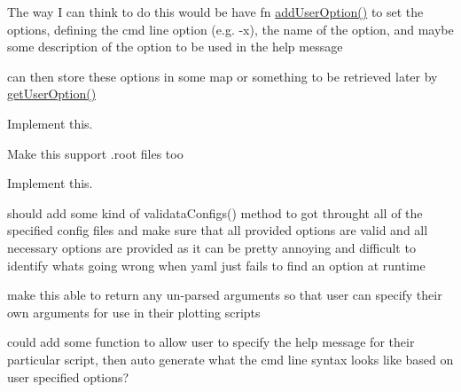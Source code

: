 \begin{DoxyRefList}
The way I can think to do this would be have fn \mbox{\hyperlink{classMaCh3Plotting_1_1PlottingManager_aeb042d09d55644d8b35632f66f1832b6}{add\+User\+Option()}} to set the options, defining the cmd line option (e.\+g. -\/x), the name of the option, and maybe some description of the option to be used in the help message 



can then store these options in some map or something to be retrieved later by \mbox{\hyperlink{classMaCh3Plotting_1_1PlottingManager_af9f60a6196a9249d7ad7fee6c7bba89a}{get\+User\+Option()}} 

\label{todo__todo000023}%
%
Implement this.  
\item[Member \mbox{\hyperlink{classMaCh3Plotting_1_1PlottingManager_a9c1177794e2fecce4e258ee8446d6569}{Ma\+Ch3\+Plotting\+::Plotting\+Manager\+::get\+Output\+Name}} (const std\+::string \&suffix)]\label{todo__todo000028}%
%
Make this support .root files too  
\item[Member \mbox{\hyperlink{classMaCh3Plotting_1_1PlottingManager_af9f60a6196a9249d7ad7fee6c7bba89a}{Ma\+Ch3\+Plotting\+::Plotting\+Manager\+::get\+User\+Option}} (std\+::string option)]\label{todo__todo000024}%
%
Implement this.  
\item[Member \mbox{\hyperlink{classMaCh3Plotting_1_1PlottingManager_a20fbe3c9673f14adb46d3cd8919e306d}{Ma\+Ch3\+Plotting\+::Plotting\+Manager\+::initialise}} ()]\label{todo__todo000020}%
%
should add some kind of validata\+Configs() method to got throught all of the specified config files and make sure that all provided options are valid and all necessary options are provided as it can be pretty annoying and difficult to identify what\textquotesingle{}s going wrong when yaml just fails to find an option at runtime  
\item[Member \mbox{\hyperlink{classMaCh3Plotting_1_1PlottingManager_a6abd05428a9f8827c67a22bd6f8ffce3}{Ma\+Ch3\+Plotting\+::Plotting\+Manager\+::parse\+Inputs}} (int argc, char $\ast$const $\ast$argv)]\label{todo__todo000021}%
%
make this able to return any un-\/parsed arguments so that user can specify their own arguments for use in their plotting scripts  
\item[Member \mbox{\hyperlink{classMaCh3Plotting_1_1PlottingManager_a8910c157ce1ec6698f3bacdf521789ff}{Ma\+Ch3\+Plotting\+::Plotting\+Manager\+::usage}} ()]\label{todo__todo000027}%
%
could add some function to allow user to specify the help message for their particular script, then auto generate what the cmd line syntax looks like based on user specified options? 


\end{DoxyRefList}
